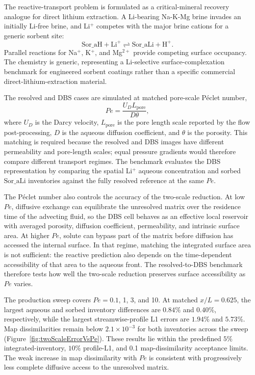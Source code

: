 \FloatBarrier

The reactive-transport problem is formulated as a critical-mineral recovery
analogue for direct lithium extraction. A Li-bearing Na-K-Mg brine invades an
initially Li-free brine, and Li$^{+}$ competes with the major brine cations for
a generic sorbent site:
\[
    \mathrm{Sor\_aH} + \mathrm{Li}^{+}
        \rightleftharpoons \mathrm{Sor\_aLi} + \mathrm{H}^{+}.
\]
Parallel reactions for Na$^{+}$, K$^{+}$, and Mg$^{2+}$ provide competing
surface occupancy. The chemistry is generic, representing a Li-selective
surface-complexation benchmark for engineered sorbent coatings rather than a
specific commercial direct-lithium-extraction material.

The resolved and DBS cases are simulated at matched pore-scale P\'{e}clet number,
\[
    Pe = \frac{U_D L_{\mathrm{pore}}}{D\theta},
\]
where $U_D$ is the Darcy velocity, $L_{\mathrm{pore}}$ is the pore length scale
reported by the flow post-processing, $D$ is the aqueous diffusion coefficient,
and $\theta$ is the porosity. This matching is required because the resolved
and DBS images have different permeability and pore-length scales; equal
pressure gradients would therefore compare different transport regimes. The
benchmark evaluates the DBS representation by comparing the spatial
Li$^{+}$ aqueous concentration and sorbed $\mathrm{Sor\_aLi}$ inventories
against the fully resolved reference at the same $Pe$.

The P\'{e}clet number also controls the accuracy of the two-scale reduction. At
low $Pe$, diffusive exchange can equilibrate the
unresolved matrix over the residence time of the advecting fluid, so the DBS
cell behaves as an effective local reservoir with averaged porosity, diffusion
coefficient, permeability, and intrinsic surface area. At higher $Pe$, solute
can bypass part of the matrix before diffusion has accessed the internal
surface. In that regime, matching the integrated surface area is not sufficient:
the reactive prediction also depends on the time-dependent accessibility of
that area to the aqueous front. The resolved-to-DBS benchmark therefore tests
how well the two-scale reduction preserves surface accessibility as $Pe$
varies.

The production sweep covers $Pe=0.1$, 1, 3, and 10. At matched
$x/L=0.625$, the largest aqueous and sorbed inventory differences are
$0.84\%$ and $0.40\%$, respectively, while the largest streamwise-profile L1
errors are $1.94\%$ and $5.73\%$. Map dissimilarities remain below
$2.1\times10^{-3}$ for both inventories across the sweep
(Figure~\ref{fig:twoScaleErrorVsPe}). These results lie within the predefined
$5\%$ integrated-inventory, $10\%$ profile-L1, and 0.1 map-dissimilarity
acceptance limits. The weak increase in map dissimilarity with $Pe$ is
consistent with progressively less complete diffusive access to the unresolved
matrix.


